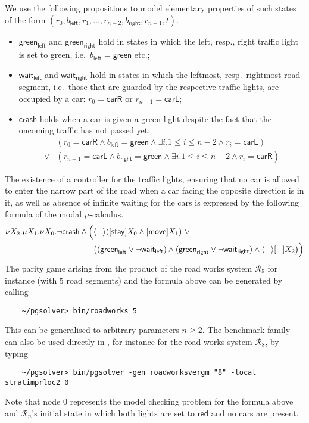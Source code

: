 We use the following propositions to model elementary properties of such states of the form
$(r_0,b_{\mathsf{left}},r_1,\ldots,r_{n-2},b_{\mathsf{right}},r_{n-1},t)$.
\begin{itemize}
\item $\mathsf{green}_{\mathsf{left}}$ and $\mathsf{green}_{\mathsf{right}}$ hold in states in which the left, resp., right traffic
      light is set to green, i.e.\ $b_{\mathsf{left}} = \mathsf{green}$ etc.;
\item $\mathsf{wait}_{\mathsf{left}}$ and $\mathsf{wait}_{\mathsf{right}}$ hold in states in which the leftmost, resp.\ rightmost
      road segment, i.e.\ those that are guarded by the respective traffic lights, are occupied by a car: $r_0 = \mathsf{carR}$ or
      $r_{n-1} = \mathsf{carL}$;
\item $\mathsf{crash}$ holds when a car is given a green light despite the fact that the oncoming traffic has not passed yet: 
      \begin{align*}
        &(r_0 = \mathsf{carR} \wedge b_{\mathsf{left}} = \mathsf{green} \wedge \exists i. 1 \le i \le n-2 \wedge r_i = \mathsf{carL}) \\
        \vee & (r_{n-1} = \mathsf{carL} \wedge b_{\mathsf{right}} = \mathsf{green} \wedge \exists i. 1 \le i \le n-2 \wedge r_i = \mathsf{carR})
      \end{align*}
\end{itemize}
The existence of a controller for the traffic lights, ensuring that no car is allowed to enter the narrow part of the road when
a car facing the opposite direction is in it, as well as absence of infinite waiting for the cars is expressed by the following 
formula of the modal $\mu$-calculus.
\begin{align*}
\nu X_2.\mu X_1.\nu X_0. \neg\mathsf{crash} \wedge \Big(&\langle - \rangle([ \mathsf{stay} ]X_0 \wedge [ \mathsf{move} ]X_1)\ \vee \ \\
&\big( (\mathsf{green}_{\mathsf{left}} \vee \neg\mathsf{wait}_{\mathsf{left}}) \wedge
(\mathsf{green}_{\mathsf{right}} \vee \neg\mathsf{wait}_{\mathsf{right}}) \wedge \langle - \rangle[ - ]X_2\big)\Big)
\end{align*}
The parity game arising from the product of the road works system $\mathcal{R}_5$ for instance (with $5$ road segments) and the formula above can
be generated by calling
\begin{verbatim}
    ~/pgsolver> bin/roadworks 5
\end{verbatim}
This can be generalised to arbitrary parameters $n \ge 2$. The benchmark family can also be used directly in \pgsolver, for instance
for the road works system $\mathcal{R}_8$, by typing  
\begin{verbatim}
    ~/pgsolver> bin/pgsolver -gen roadworksvergm "8" -local stratimprloc2 0
\end{verbatim}
Note that node $0$ represents the model checking problem for the formula above and $\mathcal{R}_n$'s initial state in which both lights
are set to $\mathsf{red}$ and no cars are present.




